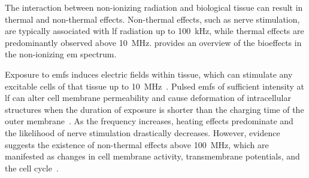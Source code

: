 The interaction between non-ionizing radiation and biological tissue can result in thermal and non-thermal effects.
Non-thermal effects, such as nerve stimulation, are typically associated with \gls{lf} radiation up to \SI{100}{\kHz}, while thermal effects are predominantly observed above \SI{10}{\MHz}.
 provides an overview of the bioeffects in the non-ionizing \gls{em} spectrum.
\begin{table}[b]
    \centering
    \caption{Summary of the effects of non-ionizing radiation on biological tissues.}
    \label{tab:interaction-mechanism}
\end{table}
Exposure to \gls{emf}s induces electric fields within tissue, which can stimulate any excitable cells of that tissue up to \SI{10}{\MHz}~\cite{Saunders2007neurobiological}.
Pulsed \gls{emf}s of sufficient intensity at \gls{lf} can alter cell membrane permeability and cause deformation of intracellular structures when the duration of exposure is shorter than the charging time of the outer membrane~\cite{Joshi2010Critical}.
As the frequency increases, heating effects predominate and the likelihood of nerve stimulation drastically decreases.
However, evidence suggests the existence of non-thermal effects above \SI{100}{\MHz}, which are manifested as changes in cell membrane activity, transmembrane potentials, and the cell cycle~\cite{Romanenko2017interaction}.
